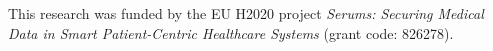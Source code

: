 
\noindent
This research was funded by the EU H2020 project \emph{Serums: Securing Medical Data in Smart Patient-Centric Healthcare Systems} (grant code: 826278).

